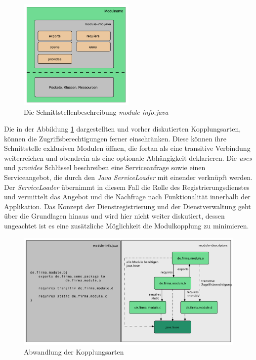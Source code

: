     \begin{figure}[h!]
      \centering
      \includegraphics[width=0.5\textwidth]{material/images/module-info.pdf}
      \caption{Die Schnittstellenbeschreibung \textit{module-info.java}}
      \label{fig:module-info}
    \end{figure}

    Die in der Abbildung \ref{fig:module-info} dargestellten und vorher diskutierten Kopplungsarten, können die Zugriffsberechtigungen ferner einschränken. Diese können ihre Schnittstelle exklusiven Modulen öffnen, die fortan als eine transitive Verbindung weiterreichen und obendrein als eine optionale Abhängigkeit deklarieren. Die \textit{uses} und \textit{provides} Schlüssel beschreiben eine Serviceanfrage sowie einen Serviceangebot, die durch den \textit{Java ServiceLoader} mit einender verknüpft werden.\newline
    Der \textit{ServiceLoader} übernimmt in diesem Fall die Rolle des Registrierungsdienstes und vermittelt das Angebot und die Nachfrage nach Funktionalität innerhalb der Applikation. Das Konzept der Dienstregistrierung und der Dienstverwaltung geht über die Grundlagen hinaus und wird hier nicht weiter diskutiert, dessen ungeachtet ist es eine zusätzliche Möglichkeit die Modulkopplung zu minimieren. \cite{softModDes,modulMitJava9} \bigbreak

      \begin{figure}[h!]
      \centering
      \includegraphics[width=\textwidth]{material/images/transitiv.pdf}
      \caption{Abwandlung der Kopplungsarten}
      \label{fig:abw-kopl}
  \end{figure}

